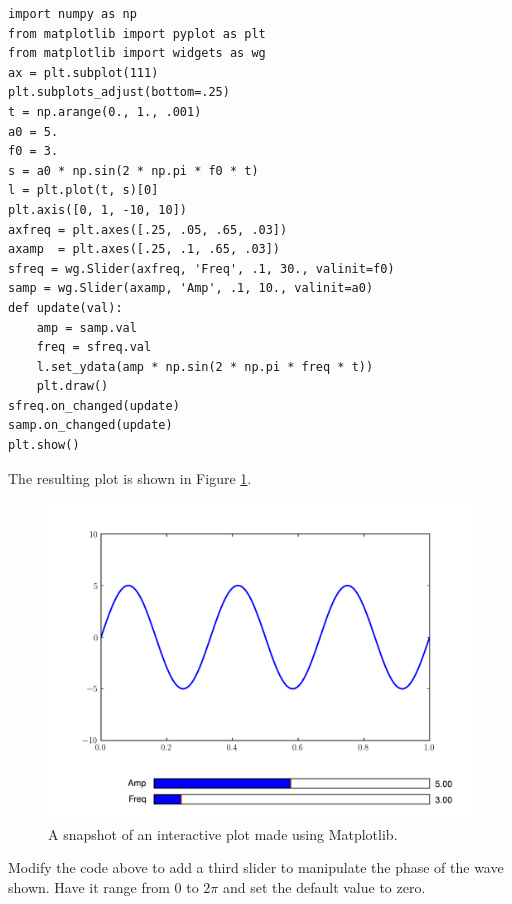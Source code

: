 
\begin{lstlisting}
import numpy as np
from matplotlib import pyplot as plt
from matplotlib import widgets as wg
ax = plt.subplot(111)
plt.subplots_adjust(bottom=.25)
t = np.arange(0., 1., .001)
a0 = 5.
f0 = 3.
s = a0 * np.sin(2 * np.pi * f0 * t)
l = plt.plot(t, s)[0]
plt.axis([0, 1, -10, 10])
axfreq = plt.axes([.25, .05, .65, .03])
axamp  = plt.axes([.25, .1, .65, .03])
sfreq = wg.Slider(axfreq, 'Freq', .1, 30., valinit=f0)
samp = wg.Slider(axamp, 'Amp', .1, 10., valinit=a0)
def update(val):
    amp = samp.val
    freq = sfreq.val
    l.set_ydata(amp * np.sin(2 * np.pi * freq * t))
    plt.draw()
sfreq.on_changed(update)
samp.on_changed(update)
plt.show()
\end{lstlisting}
The resulting plot is shown in Figure \ref{mpl:interact}.

\begin{figure}
\includegraphics[width=\textwidth]{interact.pdf}
\caption{A snapshot of an interactive plot made using Matplotlib.}
\label{mpl:interact}
\end{figure}

\begin{problem}
Modify the code above to add a third slider to manipulate the phase of the wave shown.
Have it range from 0 to $2\pi$ and set the default value to zero.
\end{problem}


